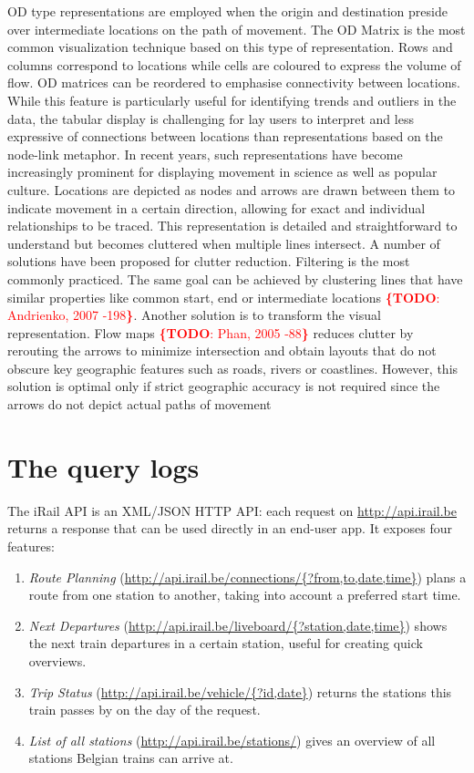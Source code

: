 \documentclass{sig-alternate}
\newcommand{\todo}[1]{\noindent\textcolor{red}{{\bf \{TODO}: #1{\bf \}}}}
\begin{document}
OD type representations are employed when the origin and destination preside over intermediate locations on the path of movement. The OD Matrix is the most common visualization technique based on this type of representation. 
Rows and columns correspond to locations while cells are coloured to express the volume of flow.
OD matrices can be reordered to emphasise connectivity between locations.
While this feature is particularly useful for identifying trends and outliers in the data, the tabular display is challenging for lay users to interpret and less expressive of connections between locations than representations based on the node-link metaphor.
In recent years, such representations have become increasingly prominent for displaying movement in science as well as popular culture.
Locations are depicted as nodes and arrows are drawn between them to indicate movement in a certain direction, allowing for exact and individual relationships to be traced. 
This representation is detailed and straightforward to understand but becomes cluttered when multiple lines intersect. 
A number of solutions have been proposed for clutter reduction. 
Filtering is the most commonly practiced. 
The same goal can be achieved by clustering lines that have similar properties like common start, end or intermediate locations \todo{Andrienko, 2007 -198}. 
Another solution is to transform the visual representation. 
Flow maps \todo{Phan, 2005 -88} reduces clutter by rerouting the arrows to minimize intersection and obtain layouts that do not obscure key geographic features such as roads, rivers or coastlines. However, this solution is optimal only if strict geographic accuracy is not required since the arrows do not depict actual paths of movement

\section{The query logs}
\label{sec:logs}

The iRail API is an XML/JSON HTTP API: each request on \url{http://api.irail.be} returns a response that can be used directly in an end-user app.
It exposes four features: 
\begin{enumerate}
\item \emph{Route Planning} (\url{http://api.irail.be/connections/{?from,to,date,time}}) plans a route from one station to another, taking into account a preferred start time.
\item \emph{Next Departures} (\url{http://api.irail.be/liveboard/{?station,date,time}}) shows the next train departures in a certain station, useful for creating quick overviews.
\item \emph{Trip Status} (\url{http://api.irail.be/vehicle/{?id,date}}) returns the stations this train passes by on the day of the request.
\item \emph{List of all stations} (\url{http://api.irail.be/stations/}) gives an overview of all stations Belgian trains can arrive at.
\end{enumerate}
\end{document}
